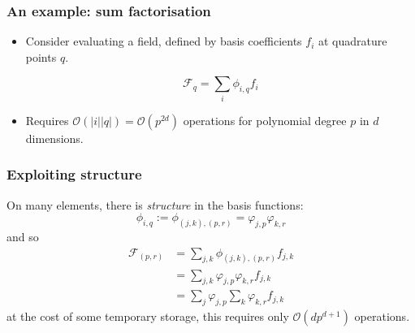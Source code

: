 \documentclass[presentation]{beamer}
\begin{document}
\begin{frame}
  \frametitle{An example: sum factorisation}
  \begin{itemize}
  \item Consider evaluating a field, defined by basis coefficients
    $f_i$ at quadrature points $q$.

  \begin{equation*}
    \mathcal{F}_q = \sum_i \phi_{i,q} f_i
  \end{equation*}

\item Requires $\mathcal{O}(|i||q|) = \mathcal{O}(p^{2d})$ operations
  for polynomial degree $p$ in $d$ dimensions.
\end{itemize}
\end{frame}

\begin{frame}
  \frametitle{Exploiting structure}
  On many elements, there is \emph{structure} in the basis functions:
  \begin{equation*}
    \phi_{i,q} := \phi_{(j,k),(p,r)} = \varphi_{j,p}\varphi_{k,r}
  \end{equation*}
  and so
  \begin{align*}
    \mathcal{F}_{(p,r)} &= \sum_{j,k} \phi_{(j,k),(p,r)} f_{j,k} \\
                        &= \sum_{j,k} \varphi_{j,p}\varphi_{k,r} f_{j,k} \\
                        &= \sum_j \varphi_{j,p} \sum_k \varphi_{k,r} f_{j,k}
  \end{align*}
  at the cost of some temporary storage, this requires only
  $\mathcal{O}(d p^{d+1})$ operations.
\end{frame}
\end{document}
